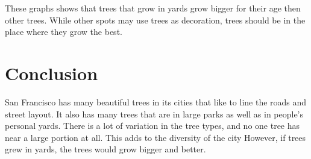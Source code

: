 \documentclass[
]{article}
\begin{document}
These graphs shows that trees that grow in yards grow bigger for their
age then other trees. While other spots may use trees as decoration,
trees should be in the place where they grow the best.

\hypertarget{conclusion}{%
\section{Conclusion}\label{conclusion}}

San Francisco has many beautiful trees in its cities that like to line
the roads and street layout. It also has many trees that are in large
parks as well as in people's personal yards. There is a lot of variation
in the tree types, and no one tree has near a large portion at all. This
adds to the diversity of the city However, if trees grew in yards, the
trees would grow bigger and better.
\end{document}
